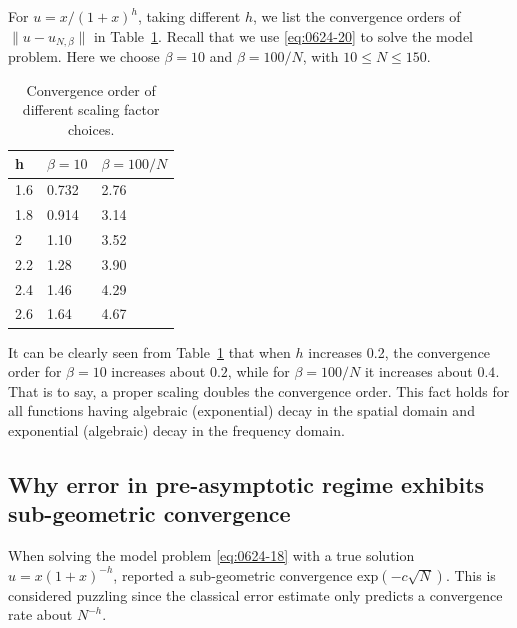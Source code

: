 \documentclass[pdflatex,sn-aps]{sn-jnl}%
\theoremstyle{thmstyleone}%
\theoremstyle{thmstyletwo}%
\theoremstyle{thmstylethree}%
\begin{document}
For $u = x/(1+x)^h$, taking different $h$, we list the convergence
orders of $\|u - u_{N,\beta}\|$ in Table~\ref{tab:conv-order}. Recall that we use \eqref{eq:0624-20}
to solve the model problem. Here we choose $\beta = 10$ and $\beta = 100/N$,
with $10 \leqslant N \leqslant 150$.

\begin{table}[h]
\caption{Convergence order of different scaling factor choices.}
\label{tab:conv-order}
\begin{tabular}{@{}lll@{}}
\toprule
    h & $\beta = 10$ & $\beta = 100/N$ \\ %
    \midrule
    1.6 & 0.732 & 2.76 \\
    1.8 & 0.914 & 3.14 \\ 
    2 & 1.10 & 3.52 \\ 
    2.2 & 1.28 & 3.90 \\ 
    2.4 & 1.46 & 4.29 \\
    2.6 & 1.64 & 4.67 \\
    \midrule
  \end{tabular}
\end{table}

It can be clearly seen from Table~\ref{tab:conv-order} that when $h$ increases 0.2, the convergence order for $\beta = 10$ increases about $0.2$, while for $\beta = 100/N$ it increases about $0.4$.
That is to say, a proper scaling doubles the convergence order. This fact holds for all functions having algebraic (exponential) decay in the spatial domain and exponential (algebraic) decay in the frequency domain.

\subsection{Why error in pre-asymptotic regime exhibits sub-geometric convergence}
\label{subsec: puzzling convergence}
When solving the model problem \eqref{eq:0624-18} with a true solution
$u = x(1+x)^{-h}$, \cite{shen2000stable} reported a sub-geometric convergence exp$(-c\sqrt{N})$.
This is considered puzzling since the classical error estimate
only predicts a convergence rate about $N^{-h}$.
\end{document}

